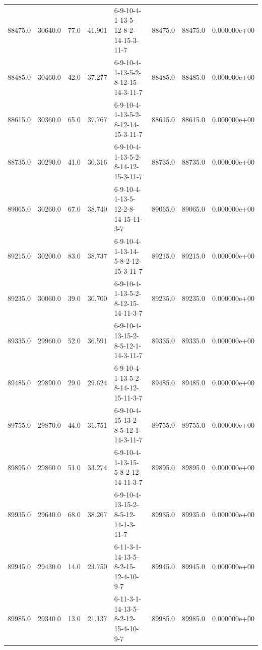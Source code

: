 \begin{tabular}{rrrrlrrr}
  88475.0 &  30640.0 &           77.0 &             41.901 &  6-9-10-4-1-13-5-12-8-2-14-15-3-11-7 &       88475.0 &         88475.0 &  0.000000e+00 \\
  88485.0 &  30460.0 &           42.0 &             37.277 &  6-9-10-4-1-13-5-2-8-12-15-14-3-11-7 &       88485.0 &         88485.0 &  0.000000e+00 \\
  88615.0 &  30360.0 &           65.0 &             37.767 &  6-9-10-4-1-13-5-2-8-12-14-15-3-11-7 &       88615.0 &         88615.0 &  0.000000e+00 \\
  88735.0 &  30290.0 &           41.0 &             30.316 &  6-9-10-4-1-13-5-2-8-14-12-15-3-11-7 &       88735.0 &         88735.0 &  0.000000e+00 \\
  89065.0 &  30260.0 &           67.0 &             38.740 &  6-9-10-4-1-13-5-12-2-8-14-15-11-3-7 &       89065.0 &         89065.0 &  0.000000e+00 \\
  89215.0 &  30200.0 &           83.0 &             38.737 &  6-9-10-4-1-13-14-5-8-2-12-15-3-11-7 &       89215.0 &         89215.0 &  0.000000e+00 \\
  89235.0 &  30060.0 &           39.0 &             30.700 &  6-9-10-4-1-13-5-2-8-12-15-14-11-3-7 &       89235.0 &         89235.0 &  0.000000e+00 \\
  89335.0 &  29960.0 &           52.0 &             36.591 &  6-9-10-4-13-15-2-8-5-12-1-14-3-11-7 &       89335.0 &         89335.0 &  0.000000e+00 \\
  89485.0 &  29890.0 &           29.0 &             29.624 &  6-9-10-4-1-13-5-2-8-14-12-15-11-3-7 &       89485.0 &         89485.0 &  0.000000e+00 \\
  89755.0 &  29870.0 &           44.0 &             31.751 &  6-9-10-4-15-13-2-8-5-12-1-14-3-11-7 &       89755.0 &         89755.0 &  0.000000e+00 \\
  89895.0 &  29860.0 &           51.0 &             33.274 &  6-9-10-4-1-13-15-5-8-2-12-14-11-3-7 &       89895.0 &         89895.0 &  0.000000e+00 \\
  89935.0 &  29640.0 &           68.0 &             38.267 &  6-9-10-4-13-15-2-8-5-12-14-1-3-11-7 &       89935.0 &         89935.0 &  0.000000e+00 \\
  89945.0 &  29430.0 &           14.0 &             23.750 &  6-11-3-1-14-13-5-8-2-15-12-4-10-9-7 &       89945.0 &         89945.0 &  0.000000e+00 \\
  89985.0 &  29340.0 &           13.0 &             21.137 &  6-11-3-1-14-13-5-8-2-12-15-4-10-9-7 &       89985.0 &         89985.0 &  0.000000e+00 \\

\end{tabular}
